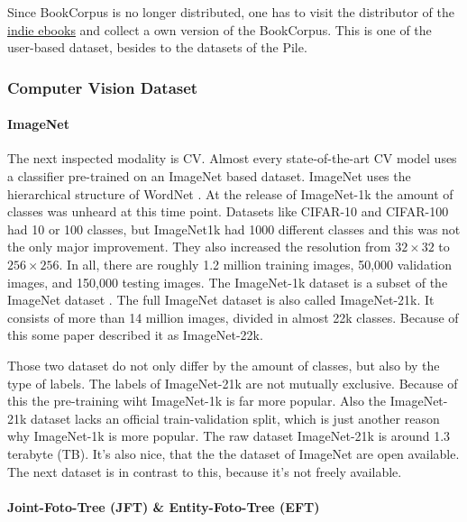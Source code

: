 \documentclass[
]{krantz}
\begin{document}
Since BookCorpus is no longer distributed, one has to visit the distributor of the \href{https://www.smashwords.com}{indie ebooks} and collect a own version of the BookCorpus. This is one of the user-based dataset, besides to the datasets of the Pile.

\hypertarget{computer-vision-dataset}{%
\subsubsection{Computer Vision Dataset}\label{computer-vision-dataset}}

\hypertarget{imagenet}{%
\paragraph{ImageNet}\label{imagenet}}

The next inspected modality is CV. Almost every state-of-the-art CV model uses a classifier pre-trained on an ImageNet based dataset. ImageNet uses the hierarchical structure of WordNet \citep{fellbaum2010wordnet}. At the release of ImageNet-1k the amount of classes was unheard at this time point. Datasets like CIFAR-10 \citep{krizhevsky2009learning} and CIFAR-100 \citep{krizhevsky2009learning} had 10 or 100 classes, but ImageNet1k had 1000 different classes and this was not the only major improvement. They also increased the resolution from \(32 \times 32\) to \(256 \times 256\). In all, there are roughly 1.2 million training images, 50,000 validation images, and 150,000 testing images. The ImageNet-1k dataset is a subset of the ImageNet dataset \citep{deng2009imagenet}. The full ImageNet dataset is also called ImageNet-21k. It consists of more than 14 million images, divided in almost 22k classes. Because of this some paper described it as ImageNet-22k.

Those two dataset do not only differ by the amount of classes, but also by the type of labels. The labels of ImageNet-21k are not mutually exclusive. Because of this the pre-training wiht ImageNet-1k is far more popular. Also the ImageNet-21k dataset lacks an official train-validation split, which is just another reason why ImageNet-1k is more popular. The raw dataset ImageNet-21k is around 1.3 terabyte (TB). It's also nice, that the the dataset of ImageNet are open available. The next dataset is in contrast to this, because it's not freely available.

\hypertarget{joint-foto-tree-jft-entity-foto-tree-eft}{%
\paragraph{Joint-Foto-Tree (JFT) \& Entity-Foto-Tree (EFT)}\label{joint-foto-tree-jft-entity-foto-tree-eft}}
\end{document}
